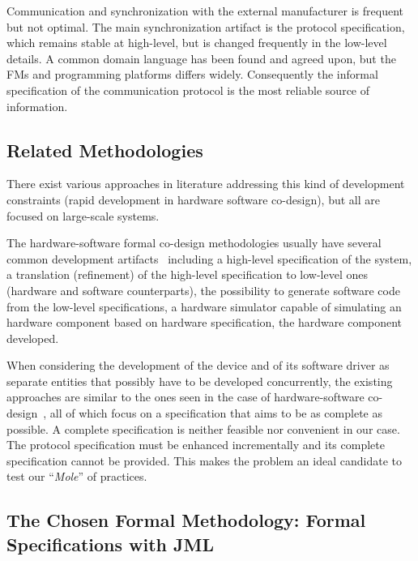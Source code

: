 \documentclass[english]{lni}
\newcommand{\mole}{``\emph{Mole}''\xspace}
\begin{document}
Communication and synchronization with the external manufacturer is frequent but not optimal.  
The main synchronization artifact is the protocol specification, which remains stable at high-level, but is changed frequently in the low-level details.  
A common domain language has been found and agreed upon, but the FMs and programming platforms differs widely.  
Consequently the informal specification of the communication protocol is the most reliable source of information.



\subsection{Related Methodologies}
\label{sec:relat-meth}

There exist various approaches in literature addressing this kind of development constraints (rapid development in hardware software co-design), but all are focused on large-scale systems.  

The hardware-software formal co-design methodologies usually have several common development artifacts~\cite{Slomka2000, Hoffman2001} including a high-level specification of the system, a translation (refinement) of the high-level specification to low-level ones (hardware and software counterparts), the possibility to generate software code from the low-level specifications, a hardware simulator capable of simulating an hardware component based on hardware specification, the hardware component developed.

When considering the development of the device and of its software driver as separate entities that possibly have to be developed concurrently, the existing approaches are similar to the ones seen in the case of hardware-software co-design~\cite{Valderrama1995,Siegmund2002,Ryzhyk2009}, all of which focus on a specification that aims to be as complete as possible.
A complete specification is neither feasible nor convenient in our case. 
The protocol specification must be enhanced incrementally and its complete specification cannot be provided.  
This makes the problem an ideal candidate to test our \mole of practices.



\subsection{The Chosen Formal Methodology: Formal Specifications with JML}
\end{document}
